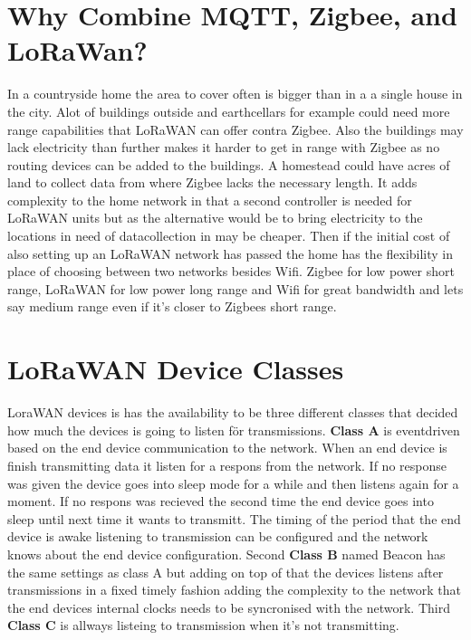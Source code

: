 \documentclass[article,a4paper]{IEEEtran}
\begin{document}
    \section{Why Combine MQTT, Zigbee, and LoRaWan?}
    In a countryside home the area to cover often is bigger than in a a single house in the city. Alot of buildings outside and earthcellars for example could need more range capabilities that LoRaWAN can offer contra Zigbee. Also the buildings may lack electricity than further makes it harder to get in range with Zigbee as no routing devices can be added to the buildings. A homestead could have acres of land to collect data from where Zigbee lacks the necessary length. It adds complexity to the home network in that a second controller is needed for LoRaWAN units but as the alternative would be to bring electricity to the locations in need of datacollection in may be cheaper. Then if the initial cost of also setting up an LoRaWAN network has passed the home has the flexibility in place of choosing between two networks besides Wifi. Zigbee for low power short range, LoRaWAN for low power long range and Wifi for great bandwidth and lets say medium range even if it's closer to Zigbees short range. 
    \section{LoRaWAN Device Classes}
    LoraWAN devices is has the availability to be three different classes that decided how much the devices is going to listen för transmissions. \textbf{Class A} is eventdriven based on the end device communication to the network. When an end device is finish transmitting data it listen for a respons from the network. If no response was given the device goes into sleep mode for a while and then listens again for a moment. If no respons was recieved the second time the end device goes into sleep until next time it wants to transmitt. The timing of the period that the end device is awake listening to transmission can be configured and the network knows about the end device configuration. Second \textbf{Class B} named Beacon has the same settings as class A but adding on top of that the devices listens after transmissions in a fixed timely fashion adding the complexity to the network that the end devices internal clocks needs to be syncronised with the network. Third \textbf{Class C} is allways listeing to transmission when it's not transmitting. 
\end{document}
